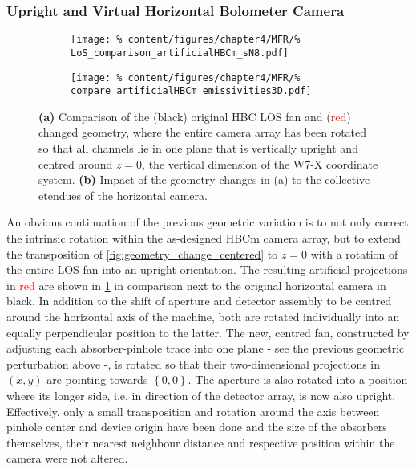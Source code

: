         \subsubsection*{Upright and Virtual Horizontal Bolometer Camera}%
%
            \begin{figure}[t]%
                \centering%
                \begin{subfigure}{0.4\textwidth}%
                    \texttt{[image: \%
                        content/figures/chapter4/MFR/\%
                        LoS\_comparison\_artificialHBCm\_sN8.pdf]}%
                    \caption{}%
                \end{subfigure}%
                \hfill%
                \begin{subfigure}{0.55\textwidth}%
                    \texttt{[image: \%
                        content/figures/chapter4/MFR/\%
                        compare\_artificialHBCm\_emissivities3D.pdf]}%
                    \caption{}%
                \end{subfigure}%
                \caption{\textbf{(a)} Comparison of the (black) original HBC LOS fan and (\textcolor{red}{red}) changed geometry, where the entire camera array has been rotated so that all channels lie in one plane that is vertically upright and centred around $z=0$, the vertical dimension of the W7-X coordinate system. \textbf{(b)} Impact of the geometry changes in (a) to the collective etendues of the horizontal camera.}\label{fig:geometry_change_artificial}%
            \end{figure}%
%
                An obvious continuation of the previous geometric variation is to not only correct the intrinsic rotation within the as-designed HBCm camera array, but to extend the transposition of \cref{fig:geometry_change_centered} to $z=0$ with a rotation of the entire LOS fan into an upright orientation. The resulting artificial projections in \textcolor{red}{red} are shown in \cref{fig:geometry_change_artificial} in comparison next to the original horizontal camera in black. In addition to the shift of aperture and detector assembly to be centred around the horizontal axis of the machine, both are rotated individually into an equally perpendicular position to the latter. The new, centred fan, constructed by adjusting each absorber-pinhole trace into one plane - see the previous geometric perturbation above -, is rotated so that their two-dimensional projections in $\left(x,y\right)$ are pointing towards $\left\{0,0\right\}$. The aperture is also rotated into a position where its longer side, i.e. in direction of the detector array, is now also upright. Effectively, only a small transposition and rotation around the axis between pinhole center and device origin have been done and the size of the absorbers themselves, their nearest neighbour distance and respective position within the camera were not altered.\\%

